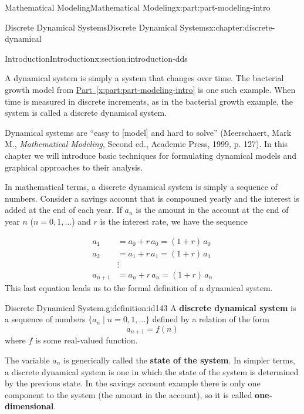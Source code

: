 \documentclass[oneside,10pt,]{book}
\newcommand{\xreffont}{\relax}
\newcommand{\terminology}[1]{\textbf{#1}}
\numberwithin{equation}{section}
\newcommand{\amp}{&}
\begin{document}
\begin{partptx}{Mathematical Modeling}{}{Mathematical Modeling}{}{}{x:part:part-modeling-intro}
\begin{chapterptx}{Discrete Dynamical Systems}{}{Discrete Dynamical Systems}{}{}{x:chapter:discrete-dynamical}
%
%
\typeout{************************************************}
\typeout{************************************************}
%
\begin{sectionptx}{Introduction}{}{Introduction}{}{}{x:section:introduction-dds}
\begin{introduction}{}%
A dynamical system is simply a system that changes over time.  The bacterial growth model from \hyperref[x:part:part-modeling-intro]{Part~{\xreffont\ref{x:part:part-modeling-intro}}} is one such example. When time is measured in discrete increments, as in the bacterial growth example, the system is called a discrete dynamical system.%
\par
Dynamical systems are ``easy to [model] and hard to solve'' (Meerschaert, Mark M., \emph{Mathematical Modeling}, Second ed., Academic Press, 1999, p. 127). In this chapter we will introduce basic techniques for formulating dynamical models and graphical approaches to their analysis.%
\par
In mathematical terms, a discrete dynamical system is simply a sequence of numbers. Consider a savings account that is compouned yearly and the interest is added at the end of each year. If \(a_n\) is the amount in the account at the end of year \(n\) (\(n = 0, 1, \dots\)) and \(r\) is the interest rate, we have the sequence%
\end{introduction}%
%
\begin{equation*}
\begin{aligned}
a_1 \amp= a_0 + r\,a_0 = (1+r)\,a_0 \\
a_2 \amp= a_1 + r\,a_1 = (1+r)\,a_1 \\
\amp \vdots \\
a_{n+1} \amp= a_n + r\,a_n = (1+r)\,a_n
\end{aligned}
\end{equation*}
This last equation leads us to the formal definition of a dynamical system.%
\begin{definition}{Discrete Dynamical System.}{g:definition:id143}%
A \terminology{discrete dynamical system} is a sequence of numbers \(\{a_n\mid n=0, 1, \dots\}\) defined by a relation of the form%
%
\begin{equation*}
a_{n+1} = f(n)
\end{equation*}
where \(f\) is some real-valued function.%
\end{definition}
The variable \(a_n\) is generically called the \terminology{state of the system}. In simpler terms, a discrete dynamical system is one in which the state of the system is determined by the previous state. In the savings account example there is only one component to the system (the amount in the account), so it is called \terminology{one-dimensional}.%

\end{sectionptx}
\end{chapterptx}
\end{partptx}
\end{document}

